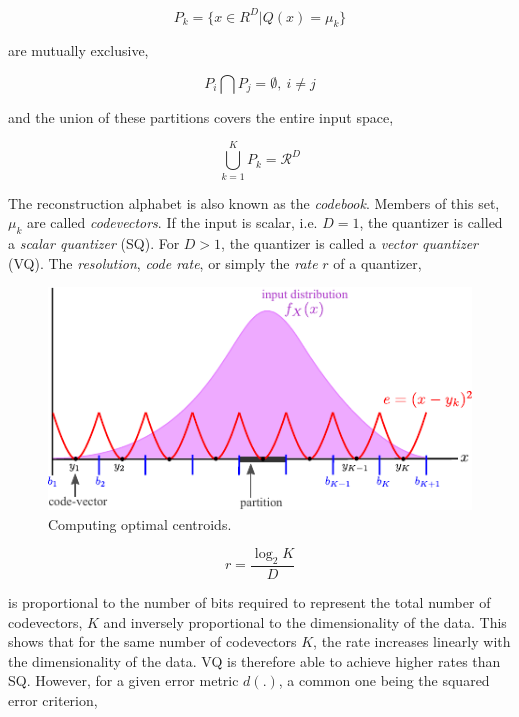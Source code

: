 \begin{equation}
P_k = \{x \in R^D | Q(x) = \mu_k\}
\end{equation}   

are mutually exclusive,

\begin{equation}
P_i \bigcap P_j = \emptyset, \ i \neq j
\end{equation}

and the union of these partitions covers the entire input space,

\begin{equation}
\bigcup\limits_{k=1}^{K} P_k=\mathcal{R}^D
\end{equation}

The reconstruction alphabet is also known as the \emph{codebook}.  Members of this set, $\mu_k$ are called \emph{codevectors}.  If the input is scalar, i.e. $D=1$, the quantizer is called a \emph{scalar quantizer} (SQ).  For $D>1$, the quantizer is called a \emph{vector quantizer} (VQ).  The \emph{resolution}, \emph{code rate}, or simply the \emph{rate} $r$ of a quantizer, 


\begin{figure}[t]			
	\includegraphics[width=1\textwidth]{figs/Quantization_MSE.pdf}
	\caption{Computing optimal centroids.}
	\label{fig:computing_optimal_centroids}	
\end{figure}

\begin{equation}
r=\frac{\log_2 K}{D}
\end{equation}  

is proportional to the number of bits required to represent the total number of codevectors, $K$ and inversely proportional to the dimensionality of the data.  This shows that for the same number of codevectors $K$, the rate increases linearly with the dimensionality of the data.  VQ is therefore able to achieve higher rates than SQ.  However, for a given error metric $d(.)$, a common one being the squared error criterion, 

